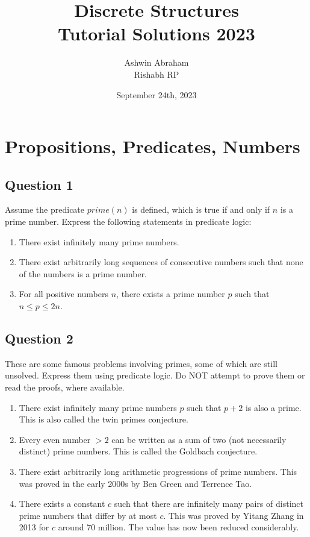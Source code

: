 \documentclass[12pt]{report}
\title{\Huge \textbf{Discrete Structures}\\\Large \textbf{Tutorial Solutions 2023}}
\author{\Large Ashwin Abraham \\ Rishabh RP}
\date{\Large September 24th, 2023}
\begin{document}
\maketitle

\tableofcontents
\newpage

\chapter{Propositions, Predicates, Numbers}
\section*{Question 1}
Assume the predicate $prime(n)$ is defined, which is true if and only if $n$ is a prime number. Express the following statements in predicate logic:
\begin{enumerate}
  \item There exist infinitely many prime numbers.
  \item There exist arbitrarily long sequences of consecutive numbers such that none of the numbers is a prime number.
  \item For all positive numbers $n$, there exists a prime number $p$ such that $n \leq p \leq 2n$.
\end{enumerate}

\section*{Question 2}
These are some famous problems involving primes, some of which are still unsolved. Express them using predicate logic. Do NOT attempt to prove them or read the proofs, where available.
\begin{enumerate}
  \item There exist infinitely many prime numbers $p$ such that $p + 2$ is also a prime. This is also called the twin primes conjecture.
  \item Every even number $> 2$ can be written as a sum of two (not necessarily distinct) prime numbers. This is called the Goldbach conjecture.
  \item There exist arbitrarily long arithmetic progressions of prime numbers. This was proved in the early 2000s by Ben Green and Terrence Tao.
  \item There exists a constant $c$ such that there are infinitely many pairs of distinct prime numbers that differ by at most $c$. This was proved by Yitang Zhang in 2013 for $c$ around 70 million. The value has now been reduced considerably.
\end{enumerate}
\end{document}
